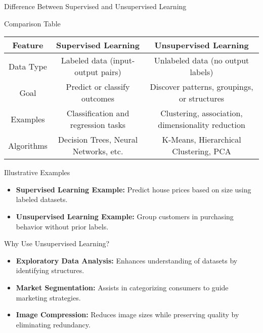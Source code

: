 \documentclass[aspectratio=169]{beamer}
\begin{document}
\begin{frame}[fragile]{Difference Between Supervised and Unsupervised Learning}
    \begin{block}{Comparison Table}
        \begin{tabular}{|c|c|c|}
            \hline
            \textbf{Feature} & \textbf{Supervised Learning} & \textbf{Unsupervised Learning} \\
            \hline
            Data Type & Labeled data (input-output pairs) & Unlabeled data (no output labels) \\
            \hline
            Goal & Predict or classify outcomes & Discover patterns, groupings, or structures \\
            \hline
            Examples & Classification and regression tasks & Clustering, association, dimensionality reduction \\
            \hline
            Algorithms & Decision Trees, Neural Networks, etc. & K-Means, Hierarchical Clustering, PCA \\
            \hline
        \end{tabular}
    \end{block}
\end{frame}

\begin{frame}[fragile]{Illustrative Examples}
    \begin{itemize}
        \item \textbf{Supervised Learning Example:} Predict house prices based on size using labeled datasets.
        \item \textbf{Unsupervised Learning Example:} Group customers in purchasing behavior without prior labels.
    \end{itemize}
\end{frame}

\begin{frame}[fragile]{Why Use Unsupervised Learning?}
    \begin{itemize}
        \item \textbf{Exploratory Data Analysis:} Enhances understanding of datasets by identifying structures.
        \item \textbf{Market Segmentation:} Assists in categorizing consumers to guide marketing strategies.
        \item \textbf{Image Compression:} Reduces image sizes while preserving quality by eliminating redundancy.
    \end{itemize}
\end{frame}
\end{document}
